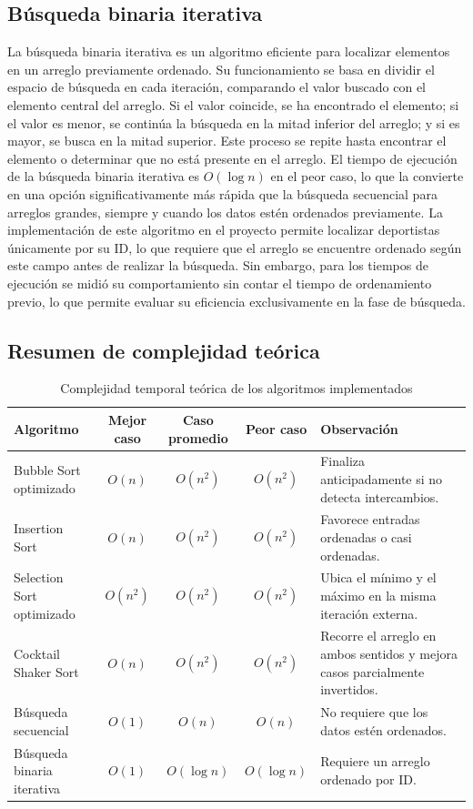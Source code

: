 \subsection{Búsqueda binaria iterativa}
La búsqueda binaria iterativa es un algoritmo eficiente para localizar elementos en un arreglo previamente ordenado. Su funcionamiento se basa en dividir el espacio de búsqueda en cada iteración, comparando el valor buscado con el elemento central del arreglo. Si el valor coincide, se ha encontrado el elemento; si el valor es menor, se continúa la búsqueda en la mitad inferior del arreglo; y si es mayor, se busca en la mitad superior. Este proceso se repite hasta encontrar el elemento o determinar que no está presente en el arreglo. El tiempo de ejecución de la búsqueda binaria iterativa es \(O(\log n)\) en el peor caso, lo que la convierte en una opción significativamente más rápida que la búsqueda secuencial para arreglos grandes, siempre y cuando los datos estén ordenados previamente. La implementación de este algoritmo en el proyecto permite localizar deportistas únicamente por su ID, lo que requiere que el arreglo se encuentre ordenado según este campo antes de realizar la búsqueda. Sin embargo, para los tiempos de ejecución se midió su comportamiento sin contar el tiempo de ordenamiento previo, lo que permite evaluar su eficiencia exclusivamente en la fase de búsqueda.

\subsection{Resumen de complejidad teórica}
\begin{table}[H]
    \centering
    \caption{Complejidad temporal teórica de los algoritmos implementados}
    \label{tab:complejidad_algoritmos}
    \small
    \begin{tabularx}{\textwidth}{l c c c X}
        \toprule
        Algoritmo & Mejor caso & Caso promedio & Peor caso & Observación \\
        \midrule
        Bubble Sort optimizado & \(O(n)\) & \(O(n^2)\) & \(O(n^2)\) & Finaliza anticipadamente si no detecta intercambios. \\
        Insertion Sort & \(O(n)\) & \(O(n^2)\) & \(O(n^2)\) & Favorece entradas ordenadas o casi ordenadas. \\
        Selection Sort optimizado & \(O(n^2)\) & \(O(n^2)\) & \(O(n^2)\) & Ubica el mínimo y el máximo en la misma iteración externa. \\
        Cocktail Shaker Sort & \(O(n)\) & \(O(n^2)\) & \(O(n^2)\) & Recorre el arreglo en ambos sentidos y mejora casos parcialmente invertidos. \\
        Búsqueda secuencial & \(O(1)\) & \(O(n)\) & \(O(n)\) & No requiere que los datos estén ordenados. \\
        Búsqueda binaria iterativa & \(O(1)\) & \(O(\log n)\) & \(O(\log n)\) & Requiere un arreglo ordenado por ID. \\
        \bottomrule
    \end{tabularx}
\end{table}

